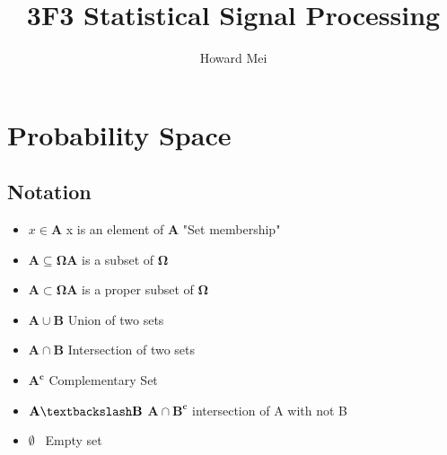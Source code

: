 \documentclass[12pt]{article}
\title{3F3 Statistical Signal Processing}
\author{Howard Mei}
\begin{document}
  \maketitle

\section{Probability Space}
\subsection{Notation}
\begin{itemize}
\item $x\in\mathbf{A}$ \qquad x is an element of $\mathbf{A}$ "Set membership"
\item $\mathbf{A\subseteq\Omega}$\qquad$\mathbf{A}$ is a subset of $\mathbf{\Omega}$
\item $\mathbf{A\subset\Omega}$\qquad$\mathbf{A}$ is a proper subset of $\mathbf{\Omega}$
\item $\mathbf{A \cup B}$ \qquad Union of two sets
\item $\mathbf{A \cap B}$ \qquad Intersection of two sets
\item $\mathbf{A^c}$ \qquad \quad \: Complementary Set
\item $\mathbf{A \textbackslash B}$ \qquad \: $\mathbf{A \cap B^c}$ intersection of A with not B
\item $\emptyset$ \qquad \qquad \, Empty set
\end{itemize}
\end{document}
